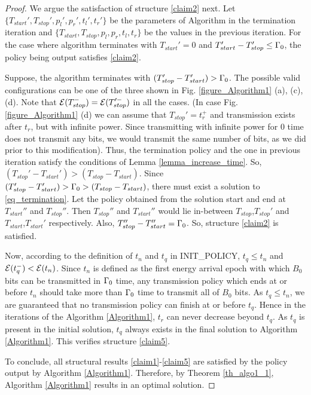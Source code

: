 \begin{proof}
We argue the satisfaction of structure \eqref{claim2} next. Let $\{T_{start}',T_{stop}',p_l',p_r',t_l',t_r'\}$ be the parameters of Algorithm in the termination iteration and $\{T_{start},T_{stop},p_l,p_r,t_l,t_r\}$ be the values in the previous iteration. For the case where algorithm terminates with $T_{start}'=0$ and $T_{start}'-T_{stop}'\le\Gamma_0$, the policy being output satisfies \eqref{claim2}. 

Suppose, the algorithm terminates with $(T_{stop}'-T_{start}')>\Gamma_0$. The possible valid configurations can be one of the three shown in Fig. \ref{figure_Algorithm1} (a), (c), (d). Note that $\mathcal{E}(T_{stop}^-)=\mathcal{E}(T_{stop}'^-)$ in all the cases. (In case Fig. \ref{figure_Algorithm1} (d) we can assume that $T_{stop}'=t_r^+$ and transmission exists after $t_r$, but with infinite power. Since transmitting with infinite power for $0$ time does not transmit any bits, we would transmit the same number of bits, as we did prior to this modification). Thus, the termination policy and the one in previous iteration satisfy the conditions of Lemma \ref{lemma_increase_time}. So, $(T_{stop}'-T_{start}')>(T_{stop}-T_{start})$. Since $(T_{stop}'-T_{start}')>\Gamma_0>(T_{stop}-T_{start})$, there must exist a solution to \eqref{eq_termination}. Let the policy obtained from the solution start and end at $T_{start}''$ and $T_{stop}''$. Then $T_{stop}''$ and $T_{start}''$ would lie in-between $T_{stop}$,$T_{stop}'$ and $T_{start}$,$T_{start}'$ respectively. Also, $T_{stop}''-T_{start}''=\Gamma_0$. So, structure \eqref{claim2} is satisfied.

Now, according to the definition of $t_n$ and $t_q$ in INIT\_POLICY, $t_q\le t_n$ and $\mathcal{E}(t_q^-)<\mathcal{E}(t_n)$. Since $t_n$ is defined as the first energy arrival epoch with which $B_0$ bits can be transmitted in $\Gamma_0$ time, any transmission policy which ends at or before $t_n$ should take more than $\Gamma_0$ time to transmit all of $B_0$ bits. As $t_q\le t_n$, we are guaranteed that no transmission policy can finish at or before $t_q$. Hence in the iterations of the Algorithm \ref{Algorithm1}, $t_r$ can never decrease beyond $t_q$. As $t_q$ is present in the initial solution, $t_q$ always exists in the final solution to Algorithm \ref{Algorithm1}. This verifies structure \eqref{claim5}.  
 
To conclude, all structural results \eqref{claim1}-\eqref{claim5} are satisfied by the policy output by Algorithm \ref{Algorithm1}. Therefore,  by Theorem \ref{th_algo1_1}, Algorithm \ref{Algorithm1} results in an optimal solution.
\end{proof}